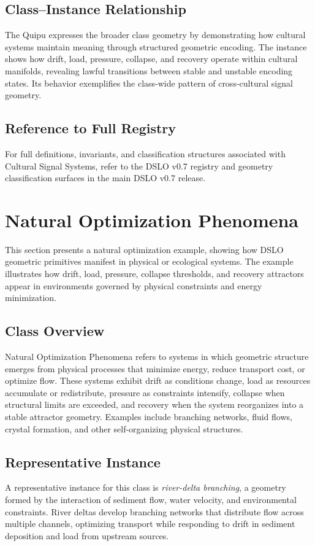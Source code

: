 \subsection{Class--Instance Relationship}
The Quipu expresses the broader class geometry by demonstrating how cultural systems maintain meaning 
through structured geometric encoding. The instance shows how drift, load, pressure, collapse, and 
recovery operate within cultural manifolds, revealing lawful transitions between stable and unstable 
encoding states. Its behavior exemplifies the class-wide pattern of cross-cultural signal geometry.

\subsection{Reference to Full Registry}
For full definitions, invariants, and classification structures associated with Cultural Signal Systems, 
refer to the DSLO v0.7 registry and geometry classification surfaces in the main DSLO v0.7 release.

\section{Natural Optimization Phenomena}
\label{sec:natural-optimization}

This section presents a natural optimization example, showing how DSLO geometric primitives manifest in 
physical or ecological systems. The example illustrates how drift, load, pressure, collapse thresholds, 
and recovery attractors appear in environments governed by physical constraints and energy minimization.

\subsection{Class Overview}
Natural Optimization Phenomena refers to systems in which geometric structure emerges from physical 
processes that minimize energy, reduce transport cost, or optimize flow. These systems exhibit drift as 
conditions change, load as resources accumulate or redistribute, pressure as constraints intensify, 
collapse when structural limits are exceeded, and recovery when the system reorganizes into a stable 
attractor geometry. Examples include branching networks, fluid flows, crystal formation, and other 
self-organizing physical structures.

\subsection{Representative Instance}
A representative instance for this class is \emph{river-delta branching}, a geometry formed by the 
interaction of sediment flow, water velocity, and environmental constraints. River deltas develop 
branching networks that distribute flow across multiple channels, optimizing transport while responding 
to drift in sediment deposition and load from upstream sources.

